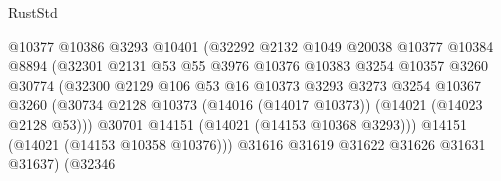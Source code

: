 \begin{lexlean}{RustStd}
\begin{coremodule}
                                        @10377
                                        @10386
                                        @3293
                                        @10401
                                        (@32292
                                          @2132
                                          @1049
                                          @20038
                                          @10377
                                          @10384
                                          @8894
                                          (@32301
                                            @2131
                                            @53
                                            @55
                                            @3976
                                            @10376
                                            @10383
                                            @3254
                                            @10357
                                            @3260
                                            @30774
                                            (@32300
                                              @2129
                                              @106
                                              @53
                                              @16
                                              @10373
                                              @3293
                                              @3273
                                              @3254
                                              @10367
                                              @3260
                                              (@30734
                                                @2128
                                                @10373
                                                (@14016 (@14017 @10373))
                                                (@14021 (@14023 @2128 @53)))
                                              @30701
                                              @14151
                                              (@14021 (@14153 @10368 @3293)))
                                            @14151
                                            (@14021 (@14153 @10358 @10376)))
                                          @31616
                                          @31619
                                          @31622
                                          @31626
                                          @31631
                                          @31637)
                                        (@32346

\end{coremodule}
\end{lexlean}
